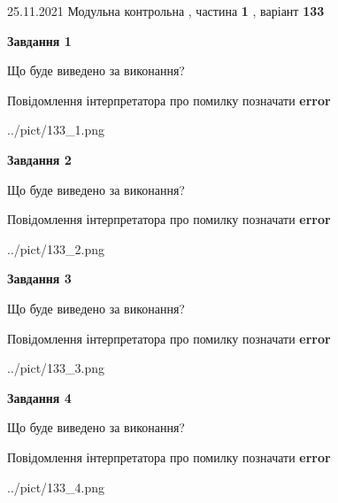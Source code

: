 \documentclass[10pt, ukrainian]{article}
\begin{document}
{25.11.2021 Модульна контрольна , частина \textbf { 1 }, варіант  \No \textbf { 133 }\par}
{
\begin {large}

{\begin {center}\textbf{Завдання 1}\end {center}}\par
Що буде виведено за виконання? \par
Повідомлення інтерпретатора про помилку позначати \textbf{error}

\begin{center}
	{../pict/133_1.png}
\end{center}
\newpage

{\begin {center}\textbf{Завдання 2}\end {center}}\par
Що буде виведено за виконання? \par
Повідомлення інтерпретатора про помилку позначати \textbf{error}

\begin{center}
	{../pict/133_2.png}
\end{center}
\newpage

{\begin {center}\textbf{Завдання 3}\end {center}}\par
Що буде виведено за виконання? \par
Повідомлення інтерпретатора про помилку позначати \textbf{error}

\begin{center}
	{../pict/133_3.png}
\end{center}
\newpage

{\begin {center}\textbf{Завдання 4}\end {center}}\par
Що буде виведено за виконання? \par
Повідомлення інтерпретатора про помилку позначати \textbf{error}

\begin{center}
	{../pict/133_4.png}
\end{center}
\newpage


\end{large}}
\end{document}
